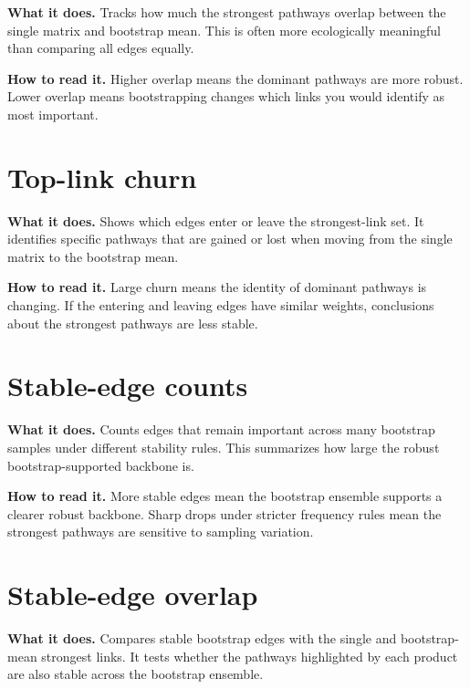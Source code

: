 \documentclass[11pt,a4paper]{article}
\begin{document}
\textbf{What it does.} Tracks how much the strongest pathways overlap between the single matrix and bootstrap mean.
This is often more ecologically meaningful than comparing all edges equally.


\textbf{How to read it.} Higher overlap means the dominant pathways are more robust.
Lower overlap means bootstrapping changes which links you would identify as most important.

\section{Top-link churn}

\textbf{What it does.} Shows which edges enter or leave the strongest-link set.
It identifies specific pathways that are gained or lost when moving from the single matrix to the bootstrap mean.


\textbf{How to read it.} Large churn means the identity of dominant pathways is changing.
If the entering and leaving edges have similar weights, conclusions about the strongest pathways are less stable.

\section{Stable-edge counts}

\textbf{What it does.} Counts edges that remain important across many bootstrap samples under different stability rules.
This summarizes how large the robust bootstrap-supported backbone is.


\textbf{How to read it.} More stable edges mean the bootstrap ensemble supports a clearer robust backbone.
Sharp drops under stricter frequency rules mean the strongest pathways are sensitive to sampling variation.

\section{Stable-edge overlap}

\textbf{What it does.} Compares stable bootstrap edges with the single and bootstrap-mean strongest links.
It tests whether the pathways highlighted by each product are also stable across the bootstrap ensemble.
\end{document}
